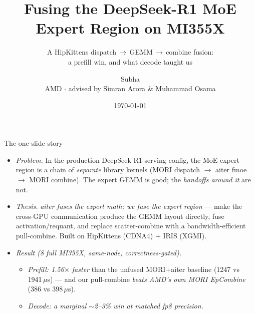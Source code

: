 \documentclass[pdf,aspectratio=169]{beamer}
\title[Fusing the DeepSeek-R1 MoE expert region]{Fusing the DeepSeek-R1 MoE Expert Region on MI355X}
\subtitle{A HipKittens dispatch\,$\to$\,GEMM\,$\to$\,combine fusion:\\ a \empr{1.56$\times$} prefill win, and what decode taught us}
\newcommand{\empy}[1]{{\color{darkorange}\emph{#1}}}
\newcommand{\empr}[1]{{\color{cardinalred}\emph{#1}}}
\begin{document}
\author[Subha]{
  \begin{tabular}{c}
  \Large Subha \\
  \footnotesize AMD \;$\cdot$\; advised by Simran Arora \& Muhammad Osama
  \end{tabular}
  \vspace{-4ex}}
\date{\today}

\begin{noheadline}
\begin{frame}\maketitle\end{frame}
\end{noheadline}

\begin{frame}{The one-slide story}
\begin{itemize}
  \item \empr{Problem.} In the production DeepSeek-R1 serving config, the MoE expert region is a chain of \emph{separate} library kernels (MORI dispatch $\to$ aiter fmoe $\to$ MORI combine). The expert GEMM is good; the \empy{handoffs around it} are not.
  \item \empr{Thesis.} \empy{aiter fuses the expert \emph{math}; we fuse the expert \emph{region}} --- make the cross-GPU communication produce the GEMM layout directly, fuse activation/requant, and replace scatter-combine with a bandwidth-efficient pull-combine. Built on HipKittens (CDNA4) + IRIS (XGMI).
  \item \empr{Result (8 full MI355X, same-node, correctness-gated).}
  \begin{itemize}
    \item \empy{Prefill: 1.56$\times$ faster} than the unfused MORI+aiter baseline (1247 vs 1941\,$\mu$s) --- and our pull-combine \emph{beats AMD's own MORI EpCombine} (386 vs 398\,$\mu$s).
    \item \empy{Decode: a marginal $\sim$2--3\% win at matched fp8 precision.}
  \end{itemize}
\end{itemize}
\end{frame}
\end{document}
